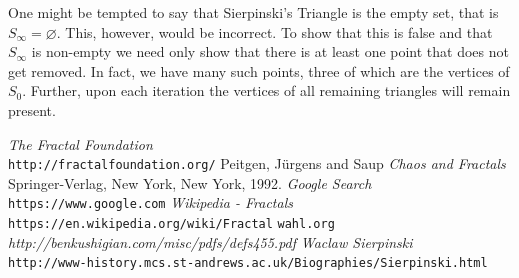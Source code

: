\documentclass[11pt,oneside,final]{article}
\begin{document}
One might be tempted to say that Sierpinski's Triangle is the empty set, that
is \(S_\infty = \varnothing\). This, however, would be incorrect. To show that
this is false and that \(S_\infty\) is non-empty we need only show that there 
is at least one point that does not get removed. In fact, we have many such
points, three of which are the vertices of \(S_0\). Further, upon each iteration
the vertices of all remaining triangles will remain present.
\clearpage
\begin{thebibliography}{9}
	\textit{The Fractal Foundation}
	\\\texttt{http://fractalfoundation.org/}
	Peitgen, J\"urgens and Saup
	\textit{Chaos and Fractals}
	Springer-Verlag, New York, New York, 1992.
	\textit{Google Search}
	\\\texttt{https://www.google.com}
	\textit{Wikipedia - Fractals}
	\\\texttt{https://en.wikipedia.org/wiki/Fractal}
	\texttt{wahl.org}
	\\\textit{http://benkushigian.com/misc/pdfs/defs455.pdf}
	\textit{Waclaw Sierpinski}
	\\\texttt{http://www-history.mcs.st-andrews.ac.uk/Biographies/Sierpinski.html}
\end{thebibliography}
\end{document}

